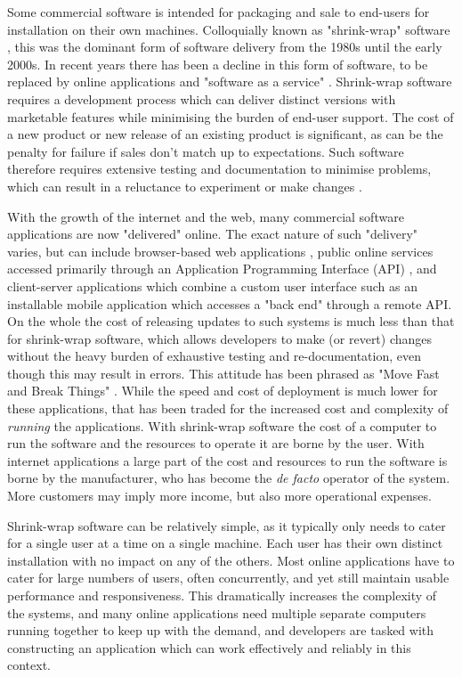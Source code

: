 Some commercial software is intended for packaging and sale to end-users for installation on their own machines. Colloquially known as "shrink-wrap" software , this was the dominant form of software delivery from the 1980s until the early 2000s. In recent years there has been a decline in this form of software, to be replaced by online applications and "software as a service" . Shrink-wrap software requires a development process which can deliver distinct versions with marketable features while minimising the burden of end-user support. The cost of a new product or new release of an existing product is significant, as can be the penalty for failure if sales don't match up to expectations. Such software therefore requires extensive testing and documentation to minimise problems, which can result in a reluctance to experiment or make changes .

With the growth of the internet and the web, many commercial software applications are now "delivered" online. The exact nature of such "delivery" varies, but can include browser-based web applications , public online services accessed primarily through an Application Programming Interface (API) , and client-server applications which combine a custom user interface such as an installable mobile application which accesses a "back end" through a remote API. On the whole the cost of releasing updates to such systems is much less than that for shrink-wrap software, which allows developers to make (or revert) changes without the heavy burden of exhaustive testing and re-documentation, even though this may result in errors. This attitude has been phrased as "Move Fast and Break Things" \citep{Taplin2018}. While the speed and cost of deployment is much lower for these applications, that has been traded for the increased cost and complexity of \emph{running} the applications. With shrink-wrap software the cost of a computer to run the software and the resources to operate it are borne by the user. With internet applications a large part of the cost and resources to run the software is borne by the manufacturer, who has become the \emph{de facto} operator of the system. More customers may imply more income, but also more operational expenses. 

Shrink-wrap software can be relatively simple, as it typically only needs to cater for a single user at a time on a single machine. Each user has their own distinct installation with no impact on any of the others. Most online applications have to cater for large numbers of users, often concurrently, and yet still maintain usable performance and responsiveness. This dramatically increases the complexity of the systems, and many online applications need multiple separate computers running together to keep up with the demand, and developers are tasked with constructing an application which can work effectively and reliably in this context.


